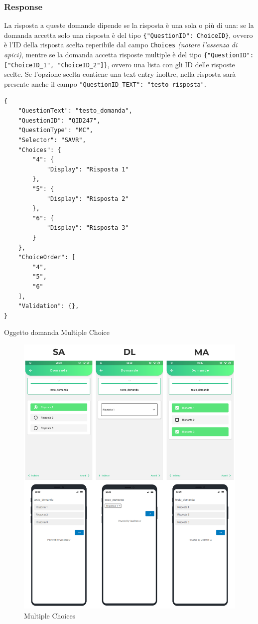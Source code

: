 \subsubsection{Response}
La risposta a queste domande dipende se la risposta è una sola o più di una: se la domanda accetta solo una risposta è del tipo \texttt{\{"QuestionID": ChoiceID\}}, ovvero è l'ID della risposta scelta reperibile dal campo \texttt{Choices} \textit{(notare l'assenza di apici)}, mentre se la domanda accetta risposte multiple è del tipo \texttt{\{"QuestionID": ["ChoiceID\_1", "ChoiceID\_2"]\}}, ovvero una lista con gli ID delle risposte scelte. Se l'opzione scelta contiene una text entry inoltre, nella risposta sarà presente anche il campo \texttt{"QuestionID\_TEXT": "testo risposta"}.

\begin{json}
\begin{verbatim}
{
    "QuestionText": "testo_domanda",
    "QuestionID": "QID247",
    "QuestionType": "MC",
    "Selector": "SAVR",
    "Choices": {
        "4": {
            "Display": "Risposta 1"
        },
        "5": {
            "Display": "Risposta 2"
        },
        "6": {
            "Display": "Risposta 3"
        }
    },
    "ChoiceOrder": [
        "4",
        "5",
        "6"
    ],
    "Validation": {},
}
\end{verbatim}
\caption{Oggetto domanda Multiple Choice}
\label{json:mc}
\end{json}

\begin{figure}[ht!]
\centering
\includegraphics[width=\textwidth]{img/mc_flutter}
\caption{Multiple Choices}
\label{fig:mc}
\end{figure}

